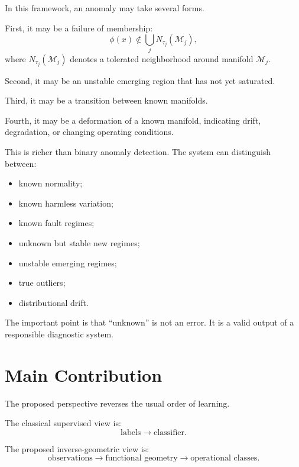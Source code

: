 \documentclass[11pt,a4paper]{article}
\begin{document}
In this framework, an anomaly may take several forms.

First, it may be a failure of membership:
\begin{equation}
    \phi(x) \notin \bigcup_j N_{\tau_j}(\mathcal{M}_j),
\end{equation}
where $N_{\tau_j}(\mathcal{M}_j)$ denotes a tolerated neighborhood around manifold $\mathcal{M}_j$.

Second, it may be an unstable emerging region that has not yet saturated.

Third, it may be a transition between known manifolds.

Fourth, it may be a deformation of a known manifold, indicating drift, degradation, or changing operating conditions.

This is richer than binary anomaly detection. The system can distinguish between:

\begin{itemize}[leftmargin=*]
    \item known normality;
    \item known harmless variation;
    \item known fault regimes;
    \item unknown but stable new regimes;
    \item unstable emerging regimes;
    \item true outliers;
    \item distributional drift.
\end{itemize}

The important point is that ``unknown'' is not an error. It is a valid output of a responsible diagnostic system.

\section{Main Contribution}

The proposed perspective reverses the usual order of learning.

The classical supervised view is:
\begin{equation}
    \text{labels} \longrightarrow \text{classifier}.
\end{equation}

The proposed inverse-geometric view is:
\begin{equation}
    \text{observations}
    \longrightarrow
    \text{functional geometry}
    \longrightarrow
    \text{operational classes}.
\end{equation}
\end{document}
